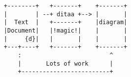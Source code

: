 \documentclass{minimal}
\begin{document}
\begin{verbatim}
    +--------+   +-------+    +-------+
    |        | --+ ditaa +--> |       |
    |  Text  |   +-------+    |diagram|
    |Document|   |!magic!|    |       |
    |     {d}|   |       |    |       |
    +---+----+   +-------+    +-------+
        :                         ^
        |       Lots of work      |
        +-------------------------+
​\end{verbatim}
\end{document}
